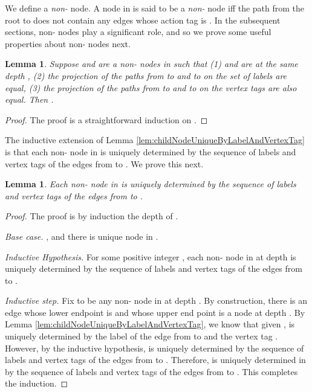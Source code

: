 \documentclass[11pt]{article}
\numberwithin{theorem}{section}
\newtheorem{lemma}[theorem]{Lemma}
\begin{document}
We define a \emph{non-} node. A node  in  is said to be a \emph{non-} node iff the path from the root to  does not contain any edges whose action tag is . In the subsequent sections, non- nodes play a significant role, and so we prove some useful properties about non- nodes next.

\begin{lemma}\label{lem:nonBotNodeUniqueExe}
Suppose  and  are a non- nodes in  such that (1)  and  are at the same depth ,  (2) the projection of the paths from  to  and  to  on the set of labels are equal, (3) the projection of  the paths from  to  and  to  on the vertex tags are also equal. Then .
\end{lemma}
\begin{proof}
The proof is a straightforward induction on .
\end{proof}

The inductive extension of Lemma \ref{lem:childNodeUniqueByLabelAndVertexTag} is that each non- node  in  is uniquely determined by the sequence of labels and vertex tags of the edges from  to . We prove this next.

\begin{lemma}\label{lem:LabelsAndVertexAgsDenoteUniqueNode}
Each non- node  in  is uniquely determined by the sequence of labels and vertex tags of the edges from  to .
\end{lemma}
\begin{proof}
The proof is by induction the depth  of .

\emph{Base case.} , and there is unique  node in .

\emph{Inductive Hypothesis.} For some positive integer , each non- node  in  at depth  is uniquely determined by the sequence of labels and vertex tags of the edges from  to .

\emph{Inductive step.} Fix  to be any non- node in  at depth . By construction, there is an edge whose lower endpoint is  and whose upper end point is a node  at depth . By Lemma \ref{lem:childNodeUniqueByLabelAndVertexTag}, we know that given ,  is uniquely determined by the label  of the edge from  to  and the vertex tag . However, by the inductive hypothesis,  is uniquely determined by the sequence of labels and vertex tags of the edges from  to . Therefore,  is uniquely determined in  by the sequence of labels and vertex tags of the edges from  to . This completes the induction.
\end{proof}
\end{document}
